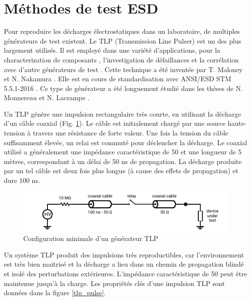 \section{Méthodes de test ESD}

Pour reproduire les décharges électrostatiques dans un laboratoire, de multiples générateurs de test existent.
Le TLP (Transmission Line Pulser) est un des plus largement utilisés.
Il est employé dans une variété d'applications, pour la characterization de composants \cite{TLPforESDProtectionCz, TLPthroubleshooting}, l'investigation de défaillances \cite{tlp-application-1, tlp-application-2} et la corrélation avec d'autre générateurs de test \cite{correlation-system-level-esd-tlp}.
Cette technique a été inventée par T. Maloney et N. Nakamura \cite{TLP}.
Elle est en cours de standardisation avec ANSI/ESD STM 5.5.1-2016 \cite{tlp-standard}.
Ce type de générateur a été longuement étudié dans les thèses de N. Monnereau \cite{phd-monnereau} et N. Lacrampe \cite{phd-lacrampe}.

Un TLP génère une impulsion rectangulaire très courte, en utilisant la décharge d'un câble coaxial (Fig. \ref{tlp_concept}).
Le câble est initialement chargé par une source haute-tension à travers une résistance de forte valeur.
Une fois la tension du câble suffisamment élevée, un relai est commuté pour déclencher la décharge.
Le coaxial utilisé a généralement une impédance caractéristique de 50\textOmega{} et une longueur de 5 mètres, correspondant à un délai de 50 ns de propagation.
La décharge produite par un tel câble est deux fois plus longue (à cause des effets de propagation) et dure 100 ns.

\begin{figure}[!h]
  \centering
  \includegraphics[width=\textwidth]{src/1/figures/tlp_concept.pdf}
  \caption{Configuration minimale d'un générateur TLP}
  \label{tlp_concept}
\end{figure}

Un système TLP produit des impulsions très reproductibles, car l'environnement est très bien maitrisé et la décharge a lieu dans un chemin de propagation blindé et isolé des perturbations extérieures.
L'impédance caractéristique de 50\textOmega{} peut être maintenue jusqu'à la charge.
Les propriétés clés d'une impulsion TLP sont données dans la figure \ref{tlp_pulse}.

